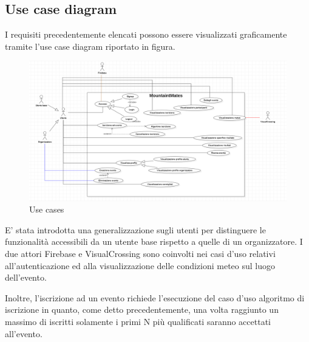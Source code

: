\clearpage
\subsection{Use case diagram}
I requisiti precedentemente elencati possono essere visualizzati graficamente tramite l'use case diagram riportato in figura.

\begin{figure}[ht!]
    \centering
    \includegraphics[scale=0.55]{immagini/UseCases.png}
    \caption{Use cases}
    \label{fig: usecases}
  \end{figure}

E' stata introdotta una generalizzazione sugli utenti per distinguere le funzionalità accessibili da un utente base
rispetto a quelle di un organizzatore.
I due attori Firebase e VisualCrossing sono coinvolti nei casi d'uso relativi all'autenticazione ed alla visualizzazione delle
condizioni meteo sul luogo dell'evento.

Inoltre, l'iscrizione ad un evento richiede l'esecuzione del caso d'uso algoritmo di iscrizione in quanto, come detto precedentemente,
una volta raggiunto un massimo di iscritti solamente i primi N più qualificati saranno accettati all'evento.